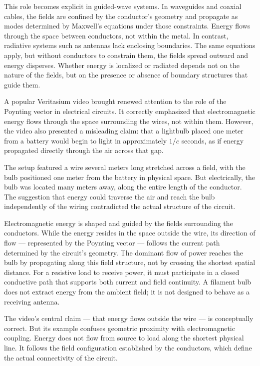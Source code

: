 This role becomes explicit in guided-wave systems. In waveguides and coaxial cables, the fields are confined by the conductor’s geometry and propagate as modes determined by Maxwell’s equations under those constraints. Energy flows through the space between conductors, not within the metal. In contrast, radiative systems such as antennas lack enclosing boundaries. The same equations apply, but without conductors to constrain them, the fields spread outward and energy disperses. Whether energy is localized or radiated depends not on the nature of the fields, but on the presence or absence of boundary structures that guide them.



\begin{commentary}
A popular Veritasium video brought renewed attention to the role of the Poynting vector in electrical circuits. It correctly emphasized that electromagnetic energy flows through the space surrounding the wires, not within them. However, the video also presented a misleading claim: that a lightbulb placed one meter from a battery would begin to light in approximately $1/c$ seconds, as if energy propagated directly through the air across that gap.

The setup featured a wire several meters long stretched across a field, with the bulb positioned one meter from the battery in physical space. But electrically, the bulb was located many meters away, along the entire length of the conductor. The suggestion that energy could traverse the air and reach the bulb independently of the wiring contradicted the actual structure of the circuit.

Electromagnetic energy is shaped and guided by the fields surrounding the conductors. While the energy resides in the space outside the wire, its direction of flow — represented by the Poynting vector — follows the current path determined by the circuit’s geometry. The dominant flow of power reaches the bulb by propagating along this field structure, not by crossing the shortest spatial distance. For a resistive load to receive power, it must participate in a closed conductive path that supports both current and field continuity. A filament bulb does not extract energy from the ambient field; it is not designed to behave as a receiving antenna.

The video’s central claim — that energy flows outside the wire — is conceptually correct. But its example confuses geometric proximity with electromagnetic coupling. Energy does not flow from source to load along the shortest physical line. It follows the field configuration established by the conductors, which define the actual connectivity of the circuit.
\end{commentary}

